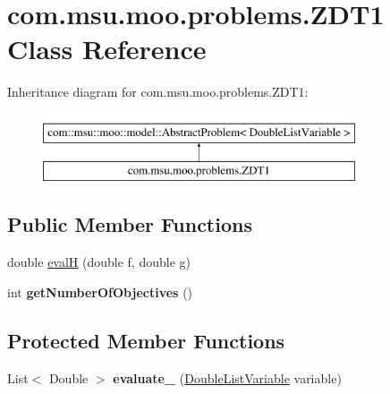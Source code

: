\hypertarget{classcom_1_1msu_1_1moo_1_1problems_1_1ZDT1}{\section{com.\-msu.\-moo.\-problems.\-Z\-D\-T1 Class Reference}
\label{classcom_1_1msu_1_1moo_1_1problems_1_1ZDT1}
}
Inheritance diagram for com.\-msu.\-moo.\-problems.\-Z\-D\-T1\-:\begin{figure}[H]
\begin{center}
\leavevmode
\includegraphics[height=2.000000cm]{classcom_1_1msu_1_1moo_1_1problems_1_1ZDT1}
\end{center}
\end{figure}
\subsection*{Public Member Functions}
\begin{DoxyCompactItemize}
\item 
double \hyperlink{classcom_1_1msu_1_1moo_1_1problems_1_1ZDT1_ab037f1467bf84172ff441cd339a017e3}{eval\-H} (double f, double g)
\item 
\hypertarget{classcom_1_1msu_1_1moo_1_1problems_1_1ZDT1_aee613b615be19f6e765785da95000637}{int {\bfseries get\-Number\-Of\-Objectives} ()}\label{classcom_1_1msu_1_1moo_1_1problems_1_1ZDT1_aee613b615be19f6e765785da95000637}

\end{DoxyCompactItemize}
\subsection*{Protected Member Functions}
\begin{DoxyCompactItemize}
\item 
\hypertarget{classcom_1_1msu_1_1moo_1_1problems_1_1ZDT1_a8f7f43becf40c6080484df819f46a087}{List$<$ Double $>$ {\bfseries evaluate\-\_\-} (\hyperlink{classcom_1_1msu_1_1moo_1_1model_1_1variables_1_1DoubleListVariable}{Double\-List\-Variable} variable)}\label{classcom_1_1msu_1_1moo_1_1problems_1_1ZDT1_a8f7f43becf40c6080484df819f46a087}

\end{DoxyCompactItemize}


